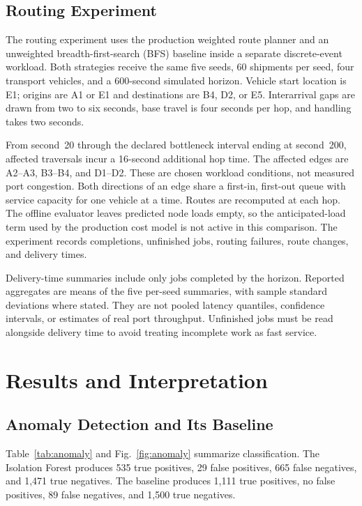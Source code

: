 \documentclass[journal]{IEEEtran}
\begin{document}
\subsection{Routing Experiment}
The routing experiment uses the production weighted route planner and an unweighted breadth-first-search (BFS) baseline inside a separate discrete-event workload. Both strategies receive the same five seeds, 60 shipments per seed, four transport vehicles, and a 600-second simulated horizon. Vehicle start location is E1; origins are A1 or E1 and destinations are B4, D2, or E5. Interarrival gaps are drawn from two to six seconds, base travel is four seconds per hop, and handling takes two seconds.

From second~20 through the declared bottleneck interval ending at second~200, affected traversals incur a 16-second additional hop time. The affected edges are A2--A3, B3--B4, and D1--D2. These are chosen workload conditions, not measured port congestion. Both directions of an edge share a first-in, first-out queue with service capacity for one vehicle at a time. Routes are recomputed at each hop. The offline evaluator leaves predicted node loads empty, so the anticipated-load term used by the production cost model is not active in this comparison. The experiment records completions, unfinished jobs, routing failures, route changes, and delivery times.

Delivery-time summaries include only jobs completed by the horizon. Reported aggregates are means of the five per-seed summaries, with sample standard deviations where stated. They are not pooled latency quantiles, confidence intervals, or estimates of real port throughput. Unfinished jobs must be read alongside delivery time to avoid treating incomplete work as fast service.

\section{Results and Interpretation}
\subsection{Anomaly Detection and Its Baseline}
Table~\ref{tab:anomaly} and Fig.~\ref{fig:anomaly} summarize classification. The Isolation Forest produces 535 true positives, 29 false positives, 665 false negatives, and 1,471 true negatives. The baseline produces 1,111 true positives, no false positives, 89 false negatives, and 1,500 true negatives.
\end{document}
